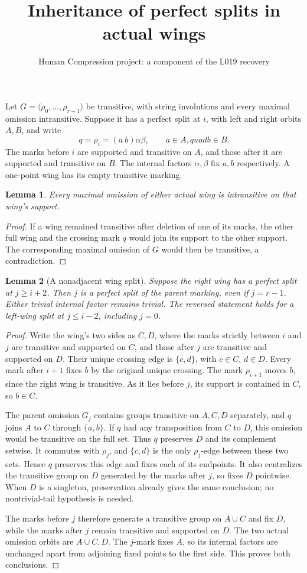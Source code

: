 \documentclass[11pt,a4paper]{article}
\title{Inheritance of perfect splits in actual wings}
\author{Human Compression project: a component of the L019 recovery}
\date{}
\newtheorem{lemma}{Lemma}
\newcommand{\gen}[1]{\langle#1\rangle}
\begin{document}
\maketitle
Let $G=\gen{\rho_0,\ldots,\rho_{r-1}}$ be transitive, with
string involutions and every maximal omission intransitive.
Suppose it has a perfect split at $i$, with left and right
orbits $A,B$, and write
\[
 q=\rho_i=(a\ b)\alpha\beta,
 \qquad a\in A,quad b\in B.
\]
The marks before $i$ are supported and transitive on $A$,
and those after it are supported and transitive on $B$.
The internal factors $\alpha,\beta$ fix $a,b$ respectively.
A one-point wing has its empty transitive marking.

\begin{lemma}\label{omissions}
Every maximal omission of either actual wing is intransitive
on that wing's support.
\end{lemma}
\begin{proof}
If a wing remained transitive after deletion of one of its
marks, the other full wing and the crossing mark $q$ would
join its support to the other support. The corresponding
maximal omission of $G$ would then be transitive, a contradiction.
\end{proof}

\begin{lemma}[A nonadjacent wing split]\label{far}
Suppose the right wing has a perfect split at $j\ge i+2$.
Then $j$ is a perfect split of the parent marking, even if
$j=r-1$. Either trivial internal factor remains trivial.
The reversed statement holds for a left-wing split at $j\le i-2$,
including $j=0$.
\end{lemma}
\begin{proof}
Write the wing's two sides as $C,D$, where the marks strictly
between $i$ and $j$ are transitive and supported on $C$,
and those after $j$ are transitive and supported on $D$.
Their unique crossing edge is $\{c,d\}$, with $c\in C$,
$d\in D$. Every mark after $i+1$ fixes $b$ by the original
unique crossing. The mark $\rho_{i+1}$ moves $b$, since
the right wing is transitive. As it lies before $j$, its
support is contained in $C$, so $b\in C$.

The parent omission $G_j$ contains groups transitive on
$A,C,D$ separately, and $q$ joins $A$ to $C$ through
$\{a,b\}$. If $q$ had any transposition from $C$ to $D$,
this omission would be transitive on the full set. Thus $q$
preserves $D$ and its complement setwise. It commutes with
$\rho_j$, and $\{c,d\}$ is the only $\rho_j$-edge between
these two sets. Hence $q$ preserves this edge and fixes each
of its endpoints. It also centralizes the transitive group
on $D$ generated by the marks after $j$, so fixes $D$
pointwise. When $D$ is a singleton, preservation already
gives the same conclusion; no nontrivial-tail hypothesis
is needed.

The marks before $j$ therefore generate a transitive group
on $A\cup C$ and fix $D$, while the marks after $j$ remain
transitive and supported on $D$. The two actual omission
orbits are $A\cup C,D$. The $j$-mark fixes $A$, so its
internal factors are unchanged apart from adjoining fixed
points to the first side. This proves both conclusions.
\end{proof}
\end{document}
